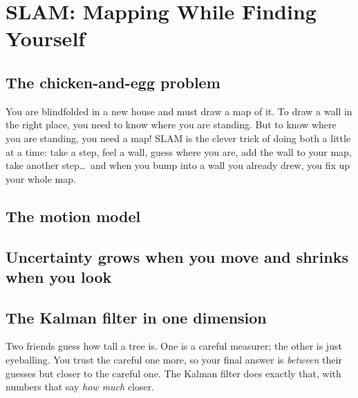 \chapter{SLAM: Mapping While Finding Yourself}

\section{The chicken-and-egg problem}

\begin{kid}
You are blindfolded in a new house and must draw a map of it. To draw a wall in the right place, you need to know where you are standing. But to know where you are standing, you need a map! SLAM is the clever trick of doing both a little at a time: take a step, feel a wall, guess where you are, add the wall to your map, take another step\ldots\ and when you bump into a wall you already drew, you fix up your whole map.
\end{kid}


\section{The motion model}


\section{Uncertainty grows when you move and shrinks when you look}


\section{The Kalman filter in one dimension}

\begin{kid}
Two friends guess how tall a tree is. One is a careful measurer; the other is just eyeballing. You trust the careful one more, so your final answer is \emph{between} their guesses but closer to the careful one. The Kalman filter does exactly that, with numbers that say \emph{how much} closer.
\end{kid}

